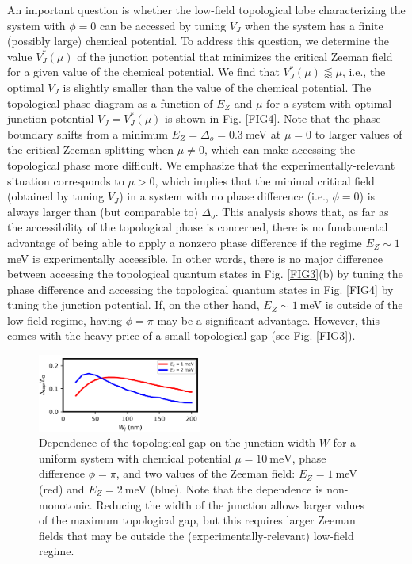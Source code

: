 \documentclass[twocolumn,aps,prb,nofootinbib]{revtex4-2}
\begin{document}
An important question is whether the low-field topological lobe characterizing the system with $\phi=0$ can be accessed by tuning $V_J$ when the system has a finite (possibly large) chemical potential. To address this question, we determine the value $V_J^*(\mu)$ of the junction potential that minimizes the critical Zeeman field for a given value of the chemical potential. 
We find that $V_J^*(\mu) \lessapprox \mu$, i.e., the optimal $V_J$ is slightly smaller than the value of the chemical potential. The topological phase diagram as a function of $E_Z$ and $\mu$ for a system with optimal junction potential $V_J=V_J^*(\mu)$ is shown in Fig. \ref{FIG4}. Note that the phase boundary shifts from a minimum $E_Z = \Delta_o=0.3~$meV at $\mu=0$ to larger values of the critical Zeeman splitting when $\mu\neq 0$, which can make accessing the topological phase more difficult. We emphasize that the experimentally-relevant situation corresponds to $\mu>0$, which implies that the  minimal critical field (obtained by tuning $V_J$) in a system with no phase difference (i.e., $\phi=0$) is always larger than (but comparable to) $\Delta_o$. This analysis shows that, as far as the accessibility of the topological phase is concerned, there is no fundamental advantage of being able to apply a nonzero phase difference if the regime $E_Z\sim 1~$meV is experimentally accessible. In other words, there is no major difference between accessing the topological quantum states in Fig. \ref{FIG3}(b) by tuning the phase difference and accessing the topological quantum states in Fig. \ref{FIG4} by tuning the junction potential. If, on the other hand, $E_Z\sim 1~$meV is outside of the low-field regime, having $\phi =\pi$ may be a significant advantage. However, this comes with the heavy price of a small topological gap (see Fig. \ref{FIG3}).

\begin{figure}[t]
\begin{center}
\includegraphics[width=0.48\textwidth]{Fig5.png}
\end{center}
\vspace{-3mm}
\caption{Dependence of the topological gap on the junction width $W$ for a uniform system with chemical potential $\mu = 10~\text{meV}$, phase difference $\phi = \pi$, and two values of the Zeeman field: $E_Z = 1~$meV (red) and $E_Z=2~$meV (blue). Note that the dependence is non-monotonic. Reducing the width of the junction allows larger values of the maximum topological gap, but this requires larger Zeeman fields that may be outside the (experimentally-relevant) low-field regime.}
\label{FIG5}
\vspace{-3mm}
\end{figure}
\end{document}

